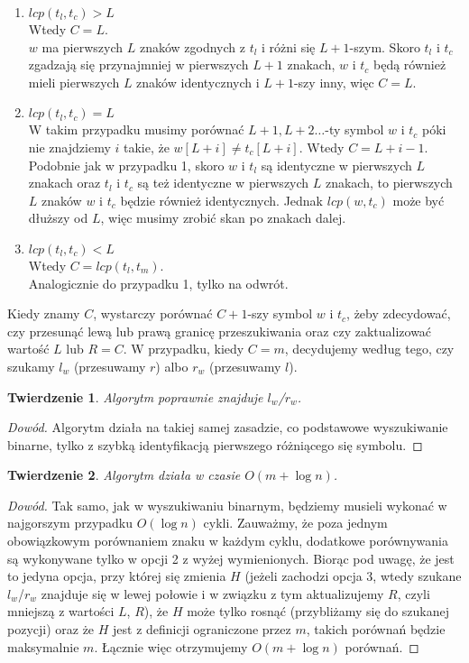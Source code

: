 \documentclass[12pt]{article}
\newtheorem*{theorem}{Twierdzenie}
\begin{document}
\begin{enumerate}
    \item $lcp(t_l, t_c) > L$ \\
          Wtedy $C = L$. \\
          $w$ ma pierwszych $L$ znaków zgodnych z $t_l$ i różni się $L+1$-szym. Skoro $t_l$ i $t_c$ zgadzają się przynajmniej w pierwszych $L+1$ znakach, $w$ i $t_c$ będą również mieli pierwszych $L$ znaków identycznych i $L+1$-szy inny, więc $C = L$.
    \item $lcp(t_l, t_c) = L$ \\
          W takim przypadku musimy porównać $L+1, L+2\ldots$-ty symbol $w$ i $t_c$ póki nie znajdziemy $i$ takie, że $w[L+i] \neq t_c[L+i]$. Wtedy $C = L + i - 1$. \\
          Podobnie jak w przypadku 1, skoro $w$ i $t_l$ są identyczne w pierwszych $L$ znakach oraz $t_l$ i $t_c$ są też identyczne w pierwszych $L$ znakach, to pierwszych $L$ znaków $w$ i $t_c$ będzie również identycznych. Jednak $lcp(w, t_c)$ może być dłuższy od $L$, więc musimy zrobić skan po znakach dalej.  
    \item $lcp(t_l, t_c) < L$ \\
          Wtedy $C = lcp(t_l, t_m)$. \\
          Analogicznie do przypadku 1, tylko na odwrót.
          
\end{enumerate}

Kiedy znamy $C$, wystarczy porównać $C+1$-szy symbol $w$ i $t_c$, żeby zdecydować, czy przesunąć lewą lub prawą granicę przeszukiwania oraz czy zaktualizować wartość $L$ lub $R = C$. W przypadku, kiedy $C = m$, decydujemy według tego, czy szukamy $l_w$ (przesuwamy $r$) albo $r_w$ (przesuwamy $l$).

\begin{theorem}
Algorytm poprawnie znajduje $l_w$/$r_w$.
\end{theorem}

\begin{proof}[Dowód]
Algorytm działa na takiej samej zasadzie, co podstawowe wyszukiwanie binarne, tylko z szybką identyfikacją pierwszego różniącego się symbolu.
\end{proof}

\begin{theorem}
Algorytm działa w czasie $O(m + \log{n})$.
\end{theorem}

\begin{proof}[Dowód]
Tak samo, jak w wyszukiwaniu binarnym, będziemy musieli wykonać w najgorszym przypadku $O(\log{n})$ cykli. Zauważmy, że poza jednym obowiązkowym porównaniem znaku w każdym cyklu, dodatkowe porównywania są wykonywane tylko w opcji 2 z wyżej wymienionych. Biorąc pod uwagę, że jest to jedyna opcja, przy której się zmienia $H$ (jeżeli zachodzi opcja 3, wtedy szukane $l_w$/$r_w$ znajduje się w lewej połowie i w związku z tym aktualizujemy $R$, czyli mniejszą z wartości $L$, $R$), że $H$ może tylko rosnąć (przybliżamy się do szukanej pozycji) oraz że $H$ jest z definicji ograniczone przez $m$, takich porównań będzie maksymalnie $m$. Łącznie więc otrzymujemy $O(m + \log{n})$ porównań.
\end{proof}
\end{document}
